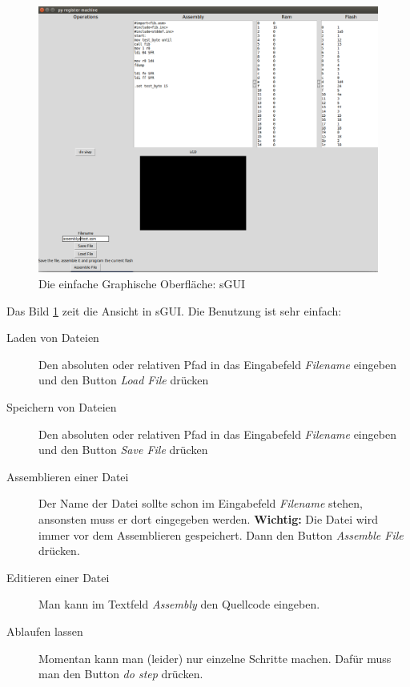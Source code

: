 \documentclass[a4paper,12pt,oneside]{scrreprt}
\begin{document}
\begin{figure}
\centering
\includegraphics[width=\linewidth]{py_register_machine_sgui.png}
\caption[Graphische Oberfläche sGUI]{Die einfache Graphische Oberfläche: sGUI}
\label{fig:sgui}
\end{figure}

Das Bild \ref{fig:sgui} zeit die Ansicht in sGUI.  
Die Benutzung ist sehr einfach:

\begin{description}

\item[Laden von Dateien] Den absoluten oder relativen Pfad in das Eingabefeld \textit{Filename} eingeben und den Button \textit{Load File} drücken

\item[Speichern von Dateien] Den absoluten oder relativen Pfad in das Eingabefeld \textit{Filename} eingeben und den Button \textit{Save File} drücken

\item[Assemblieren einer Datei] Der Name der Datei sollte schon im Eingabefeld \textit{Filename} stehen, ansonsten muss er dort eingegeben werden. \textbf{Wichtig:} Die Datei wird immer vor dem Assemblieren gespeichert. Dann den Button \textit{Assemble File} drücken.

\item[Editieren einer Datei] Man kann im Textfeld \textit{Assembly} den Quellcode eingeben.

\item[Ablaufen lassen] Momentan kann man (leider) nur einzelne Schritte machen. Dafür muss man den Button \textit{do step} drücken.

\end{description}
\end{document}
